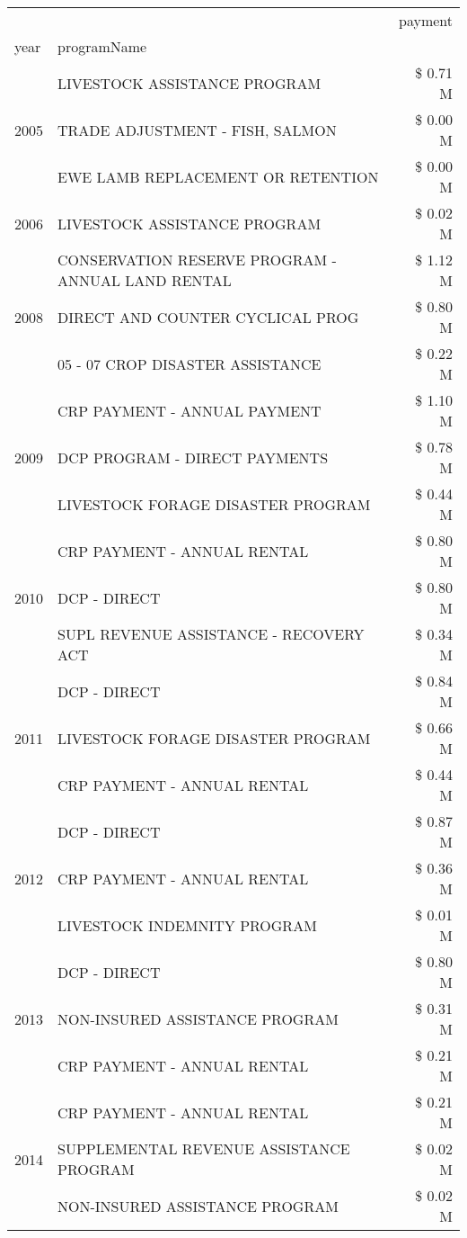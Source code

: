 \begin{tabular}{llr}
\toprule
 &  & payment \\
year & programName &  \\
\midrule
\multirow[t]{3}{*}{2005} & LIVESTOCK ASSISTANCE PROGRAM & \$ 0.71 M \\
 & TRADE ADJUSTMENT - FISH, SALMON & \$ 0.00 M \\
 & EWE LAMB REPLACEMENT OR RETENTION & \$ 0.00 M \\
\cline{1-3}
2006 & LIVESTOCK ASSISTANCE PROGRAM & \$ 0.02 M \\
\cline{1-3}
\multirow[t]{3}{*}{2008} & CONSERVATION RESERVE PROGRAM - ANNUAL LAND RENTAL & \$ 1.12 M \\
 & DIRECT AND COUNTER CYCLICAL PROG & \$ 0.80 M \\
 & 05 - 07 CROP DISASTER ASSISTANCE & \$ 0.22 M \\
\cline{1-3}
\multirow[t]{3}{*}{2009} & CRP PAYMENT - ANNUAL PAYMENT & \$ 1.10 M \\
 & DCP PROGRAM - DIRECT PAYMENTS & \$ 0.78 M \\
 & LIVESTOCK FORAGE DISASTER  PROGRAM & \$ 0.44 M \\
\cline{1-3}
\multirow[t]{3}{*}{2010} & CRP PAYMENT - ANNUAL RENTAL & \$ 0.80 M \\
 & DCP - DIRECT & \$ 0.80 M \\
 & SUPL REVENUE ASSISTANCE - RECOVERY ACT & \$ 0.34 M \\
\cline{1-3}
\multirow[t]{3}{*}{2011} & DCP - DIRECT & \$ 0.84 M \\
 & LIVESTOCK FORAGE DISASTER PROGRAM & \$ 0.66 M \\
 & CRP PAYMENT - ANNUAL RENTAL & \$ 0.44 M \\
\cline{1-3}
\multirow[t]{3}{*}{2012} & DCP - DIRECT & \$ 0.87 M \\
 & CRP PAYMENT - ANNUAL RENTAL & \$ 0.36 M \\
 & LIVESTOCK INDEMNITY PROGRAM & \$ 0.01 M \\
\cline{1-3}
\multirow[t]{3}{*}{2013} & DCP - DIRECT & \$ 0.80 M \\
 & NON-INSURED ASSISTANCE PROGRAM & \$ 0.31 M \\
 & CRP PAYMENT - ANNUAL RENTAL & \$ 0.21 M \\
\cline{1-3}
\multirow[t]{3}{*}{2014} & CRP PAYMENT - ANNUAL RENTAL & \$ 0.21 M \\
 & SUPPLEMENTAL REVENUE ASSISTANCE PROGRAM & \$ 0.02 M \\
 & NON-INSURED ASSISTANCE PROGRAM & \$ 0.02 M \\

\end{tabular}
